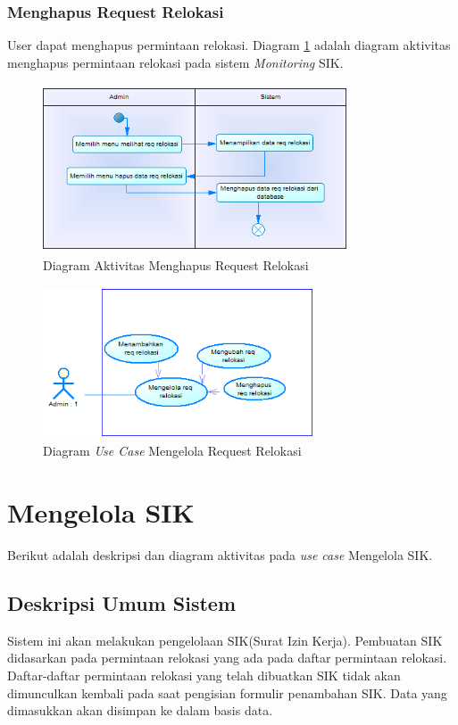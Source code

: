 	\subsubsection{Menghapus Request Relokasi}
	User dapat menghapus permintaan relokasi. Diagram \ref{figure:activity_menghapus_req_relokasi} adalah diagram aktivitas menghapus permintaan relokasi pada sistem \textit{Monitoring} SIK.
	\begin{figure}[h]
	\centerline {\includegraphics[width=9cm,height=5cm]{bab4/ActivityDiagram_MenghapusReqRelokasi.png}}
	\caption{Diagram Aktivitas Menghapus Request Relokasi}
	\label{figure:activity_menghapus_req_relokasi}
	\end{figure}		

	\begin{figure}[h]
	\centerline {\includegraphics[width=8cm,height=4.5cm]{bab4/use-case-mengelola-req-relokasi.png}}
	\caption{Diagram \textit{Use Case} Mengelola Request Relokasi}
	\label{figure:use_case_mengelola_req_relokasi}
	\end{figure}

\section{Mengelola SIK}
Berikut adalah deskripsi dan diagram aktivitas pada \textit{use case} Mengelola SIK.
\subsection{Deskripsi Umum Sistem}
\tab Sistem ini akan melakukan pengelolaan SIK(Surat Izin Kerja). Pembuatan SIK didasarkan pada permintaan relokasi yang ada pada daftar permintaan relokasi. Daftar-daftar permintaan relokasi yang telah dibuatkan SIK tidak akan dimunculkan kembali pada saat pengisian formulir penambahan SIK. Data yang dimasukkan akan disimpan ke dalam basis data.
